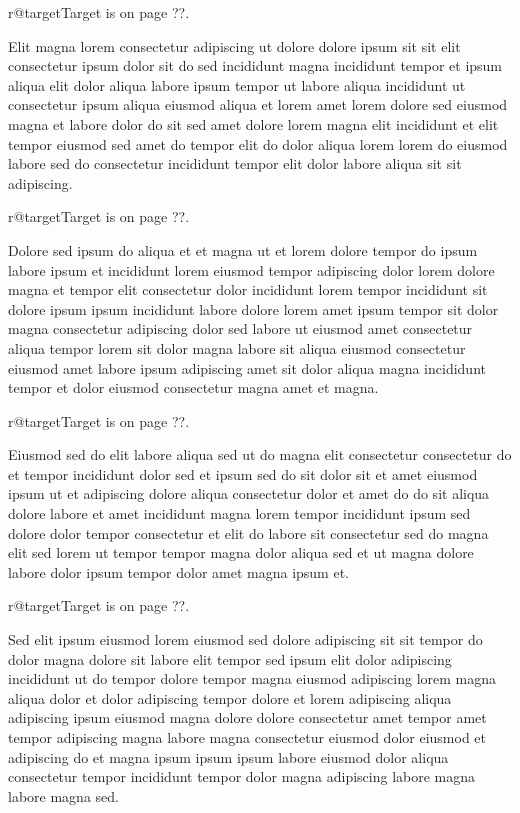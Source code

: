 \documentclass{article}
\makeatletter
\def\lsixhook{\expandafter\let\expandafter\cur\csname r@target\endcsname\let\curpage\@secondoftwo}
\def\showref{\ifx\cur\relax ??\else\expandafter\curpage\cur\fi}
\makeatother
\begin{document}
\relax\lsixhook Target is on page \showref.

Elit magna lorem consectetur adipiscing ut dolore dolore ipsum sit sit elit consectetur ipsum dolor sit do sed incididunt magna incididunt tempor et ipsum aliqua elit dolor aliqua labore ipsum tempor ut labore aliqua incididunt ut consectetur ipsum aliqua eiusmod aliqua et lorem amet lorem dolore sed eiusmod magna et labore dolor do sit sed amet dolore lorem magna elit incididunt et elit tempor eiusmod sed amet do tempor elit do dolor aliqua lorem lorem do eiusmod labore sed do consectetur incididunt tempor elit dolor labore aliqua sit sit adipiscing.

\relax\lsixhook Target is on page \showref.

Dolore sed ipsum do aliqua et et magna ut et lorem dolore tempor do ipsum labore ipsum et incididunt lorem eiusmod tempor adipiscing dolor lorem dolore magna et tempor elit consectetur dolor incididunt lorem tempor incididunt sit dolore ipsum ipsum incididunt labore dolore lorem amet ipsum tempor sit dolor magna consectetur adipiscing dolor sed labore ut eiusmod amet consectetur aliqua tempor lorem sit dolor magna labore sit aliqua eiusmod consectetur eiusmod amet labore ipsum adipiscing amet sit dolor aliqua magna incididunt tempor et dolor eiusmod consectetur magna amet et magna.

\relax\lsixhook Target is on page \showref.

Eiusmod sed do elit labore aliqua sed ut do magna elit consectetur consectetur do et tempor incididunt dolor sed et ipsum sed do sit dolor sit et amet eiusmod ipsum ut et adipiscing dolore aliqua consectetur dolor et amet do do sit aliqua dolore labore et amet incididunt magna lorem tempor incididunt ipsum sed dolore dolor tempor consectetur et elit do labore sit consectetur sed do magna elit sed lorem ut tempor tempor magna dolor aliqua sed et ut magna dolore labore dolor ipsum tempor dolor amet magna ipsum et.

\relax\lsixhook Target is on page \showref.

Sed elit ipsum eiusmod lorem eiusmod sed dolore adipiscing sit sit tempor do dolor magna dolore sit labore elit tempor sed ipsum elit dolor adipiscing incididunt ut do tempor dolore tempor magna eiusmod adipiscing lorem magna aliqua dolor et dolor adipiscing tempor dolore et lorem adipiscing aliqua adipiscing ipsum eiusmod magna dolore dolore consectetur amet tempor amet tempor adipiscing magna labore magna consectetur eiusmod dolor eiusmod et adipiscing do et magna ipsum ipsum ipsum labore eiusmod dolor aliqua consectetur tempor incididunt tempor dolor magna adipiscing labore magna labore magna sed.
\end{document}

